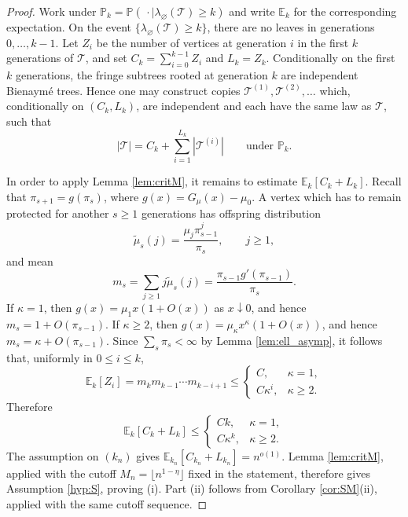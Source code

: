\documentclass[a4paper,11pt]{article}
\newcommand{\E}{\mathbb{E}}
\DeclareRobustCommand{\P}{\mathbb{P}}
\DeclareRobustCommand{\1}{\mathbf{1}}
\begin{document}
\begin{proof}
  Work under $\P_k=\P(\,\cdot\mid \lambda_\varnothing(\mathcal T)\ge k)$
  and write $\E_k$ for the corresponding expectation. On the event
  $\{\lambda_\varnothing(\mathcal T)\ge k\}$, there are no leaves in
  generations $0,\ldots,k-1$. Let $Z_i$ be the number of vertices at
  generation $i$ in the first $k$ generations of $\mathcal T$, and set
  $C_k=\sum_{i=0}^{k-1}Z_i$ and $L_k=Z_k$. Conditionally on the first $k$
  generations, the fringe subtrees rooted at generation $k$ are independent
  Bienaym\'e trees. Hence one may construct copies $\mathcal T^{(1)},\mathcal T^{(2)},\ldots$ which,
conditionally on $(C_k,L_k)$, are independent and each have the same law
as $\mathcal T$, such that
  $$
    |\mathcal T|
    =
    C_k+\sum_{i=1}^{L_k}|\mathcal T^{(i)}|
    \qquad\textrm{under }\P_k.
  $$

In order to apply Lemma \ref{lem:critM}, it remains to estimate
$\E_k[C_k+L_k]$. Recall that
  $\pi_{s+1}=g(\pi_s)$, where $g(x)=G_\mu(x)-\mu_0$. A vertex which has to
  remain protected for another $s\ge1$ generations has offspring distribution
  $$
    \widetilde\mu_s(j)=\frac{\mu_j\pi_{s-1}^j}{\pi_s},
    \qquad j\ge1,
  $$
  and mean
  $$
    m_s
    =
    \sum_{j\ge1}j\widetilde\mu_s(j)
    =
    \frac{\pi_{s-1}g'(\pi_{s-1})}{\pi_s}.
  $$
  If $\kappa=1$, then $g(x)=\mu_1x(1+O(x))$ as $x\downarrow0$, and hence
  $m_s=1+O(\pi_{s-1})$. If $\kappa\ge2$, then
  $g(x)=\mu_\kappa x^\kappa(1+O(x))$, and hence
  $m_s=\kappa+O(\pi_{s-1})$. Since $\sum_s \pi_s<\infty$ by Lemma
  \ref{lem:ell_asymp}, it follows that, uniformly in $0\le i\le k$,
  $$
    \E_k[Z_i]
    =
    m_km_{k-1}\cdots m_{k-i+1}
    \le
    \begin{cases}
      C, & \kappa=1,\\
      C\kappa^i, & \kappa\ge2.
    \end{cases}
  $$
  Therefore
  $$
    \E_k[C_k+L_k]
    \le
    \begin{cases}
      Ck, & \kappa=1,\\
      C\kappa^k, & \kappa\ge2.
    \end{cases}
  $$
The assumption on $(k_n)$ gives
$\E_{k_n}[C_{k_n}+L_{k_n}]=n^{o(1)}$. Lemma \ref{lem:critM}, applied with
the cutoff $M_n=\lfloor n^{1-\eta}\rfloor$ fixed in the statement, therefore
gives Assumption \ref{hyp:S}, proving \textup{(i)}. Part \textup{(ii)}
follows from Corollary \ref{cor:SM}\textup{(ii)}, applied with the same
cutoff sequence.
\end{proof}
\end{document}
